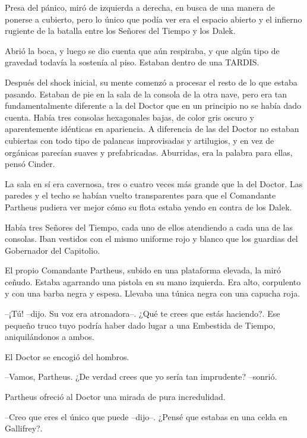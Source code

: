 Presa del pánico, miró de izquierda a derecha, en busca de una manera de ponerse a cubierto, pero lo único que podía ver era el espacio abierto y el infierno rugiente de la batalla entre los Señores del Tiempo y los Dalek.

Abrió la boca, y luego se dio cuenta que aún respiraba, y que algún tipo de gravedad todavía la sostenía al piso. Estaban dentro de una TARDIS.

Después del shock inicial, su mente comenzó a procesar el resto de lo que estaba pasando. Estaban de pie en la sala de la consola de la otra nave, pero era tan fundamentalmente diferente a la del Doctor que en un principio no se había dado cuenta. Había tres consolas hexagonales bajas, de color gris oscuro y aparentemente idénticas en apariencia. A diferencia de las del Doctor no estaban cubiertas con todo tipo de palancas improvisadas y artilugios, y en vez de orgánicas parecían suaves y prefabricadas. Aburridas, era la palabra para ellas, pensó Cinder.

La sala en sí era cavernosa, tres o cuatro veces más grande que la del Doctor. Las paredes y el techo se habían vuelto transparentes para que el Comandante Partheus pudiera ver mejor cómo su flota estaba yendo en contra de los Dalek.

Había tres Señores del Tiempo, cada uno de ellos atendiendo a cada una de las consolas. Iban vestidos con el mismo uniforme rojo y blanco que los guardias del Gobernador del Capitolio.

El propio Comandante Partheus, subido en una plataforma elevada, la miró ceñudo. Estaba agarrando una pistola en su mano izquierda. Era alto, corpulento y con una barba negra y espesa. Llevaba una túnica negra con una capucha roja. 



--¡Tú! --dijo. Su voz era atronadora--. ¿Qué te crees que estás haciendo?. Ese pequeño truco tuyo podría haber dado lugar a una Embestida de Tiempo, aniquilándonos a ambos.



El Doctor se encogió del hombros. 



--Vamos, Partheus. ¿De verdad crees que yo sería tan imprudente? --sonrió.



Partheus ofreció al Doctor una mirada de pura incredulidad. 



--Creo que eres el único que puede --dijo--. ¿Pensé que estabas en una celda en Gallifrey?.

